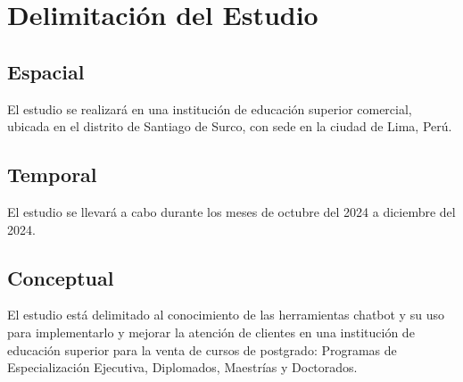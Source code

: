 \documentclass[10pt,a4paper]{article}
\begin{document}
	
	\section{Delimitación del Estudio}
		    
	\subsection{Espacial}

	El estudio se realizará en una institución de educación superior comercial, ubicada en el distrito de Santiago de Surco, con sede en la ciudad de Lima, Perú.

 

    \subsection{Temporal}
	El estudio se llevará a cabo durante los meses de octubre del 2024 a diciembre del 2024.

  

    \subsection{Conceptual}
	El estudio está delimitado al conocimiento de las herramientas chatbot y su uso para implementarlo y mejorar la atención de clientes en una institución de educación superior para la venta de cursos de postgrado: Programas de Especialización Ejecutiva, Diplomados, Maestrías y Doctorados. 

	
\end{document}
